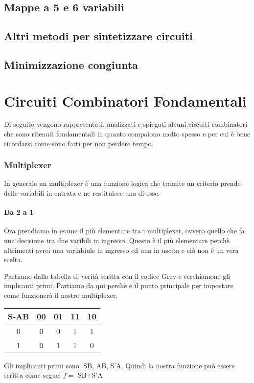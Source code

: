 \documentclass{book}
\begin{document}
\section{Mappe a 5 e 6 variabili}
\section{Altri metodi per sintetizzare circuiti}
\section{Minimizzazione congiunta}
\newpage	
\chapter{Circuiti Combinatori Fondamentali}

Di seguito vengono rappresentati, analizzati e spiegati alcuni circuiti combinatori che sono ritenuti fondamentali in quanto compaiono molto spesso e per cui è bene ricordarsi come sono fatti per non perdere tempo.
\subsection{Multiplexer}
In generale un multiplexer è una funzione logica che tramite un criterio prende delle variabili in entrata e ne restituisce una di esse.
\subsubsection{Da 2 a 1}
Ora prendiamo in esame il più elementare tra i multiplexer, ovvero quello che fa una decisione tra due varibili in ingresso.
Questo è il più elementare perchè altrimenti avrei una variabiule in ingresso ed una in uscita e ciò non è un vera scelta.

Partiamo dalla tabella di verità scritta con il codice Grey e cerchiamone gli implicanti primi.
Partiamo da qui perchè è il punto principale per impostare come funzionerà il nostro multiplexer.

\break\nextline
\begin{tabular}{|c|c|c|c|c|}
\hline
S-AB & 00 & 01 & 11 & 10 \\ \hline
0 &    0  &  0 & 1  & 1  \\ \hline  
1 &    0  &  1 & 1  & 0  \\
\hline
\end{tabular}\break


Gli implicanti primi sono: SB, AB, S'A.
Quindi la nostra funzione può essere scritta come segue:
\( f=\) SB+S'A
\end{document}
